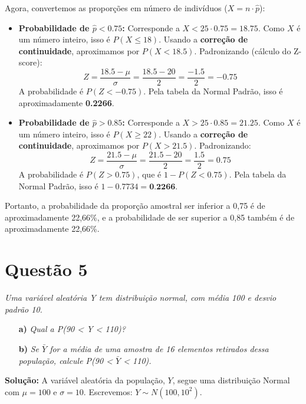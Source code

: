 \documentclass[12pt, a4paper]{article}
\begin{document}
\begin{itemize}
    Agora, convertemos as proporções em número de indivíduos ($X = n \cdot \hat{p}$):
    \begin{itemize}
        \item \textbf{Probabilidade de $\hat{p} < 0.75$:}
        Corresponde a $X < 25 \cdot 0.75 = 18.75$. Como $X$ é um número inteiro, isso é $P(X \le 18)$.
        Usando a \textbf{correção de continuidade}, aproximamos por $P(X < 18.5)$.
        Padronizando (cálculo do Z-score):
        $$ Z = \frac{18.5 - \mu}{\sigma} = \frac{18.5 - 20}{2} = \frac{-1.5}{2} = -0.75 $$
        A probabilidade é $P(Z < -0.75)$. Pela tabela da Normal Padrão, isso é aproximadamente \textbf{0.2266}.
        
        \item \textbf{Probabilidade de $\hat{p} > 0.85$:}
        Corresponde a $X > 25 \cdot 0.85 = 21.25$. Como $X$ é um número inteiro, isso é $P(X \ge 22)$.
        Usando a \textbf{correção de continuidade}, aproximamos por $P(X > 21.5)$.
        Padronizando:
        $$ Z = \frac{21.5 - \mu}{\sigma} = \frac{21.5 - 20}{2} = \frac{1.5}{2} = 0.75 $$
        A probabilidade é $P(Z > 0.75)$, que é $1 - P(Z < 0.75)$. Pela tabela da Normal Padrão, isso é $1 - 0.7734 = \textbf{0.2266}$.
    \end{itemize}
    Portanto, a probabilidade da proporção amostral ser inferior a 0,75 é de aproximadamente 22,66\%, e a probabilidade de ser superior a 0,85 também é de aproximadamente 22,66\%.
    
\end{itemize}

\section*{Questão 5}
\textit{Uma variável aleatória Y tem distribuição normal, com média 100 e desvio padrão 10.}
\begin{itemize}
    \item[\textbf{a)}] \textit{Qual a P(90 < Y < 110)?}
    \item[\textbf{b)}] \textit{Se $\bar{Y}$ for a média de uma amostra de 16 elementos retirados dessa população, calcule P(90 < $\bar{Y}$ < 110).}
\end{itemize}

\textbf{Solução:}
A variável aleatória da população, $Y$, segue uma distribuição Normal com $\mu=100$ e $\sigma=10$. Escrevemos: $Y \sim N(100, 10^2)$.
\end{document}
